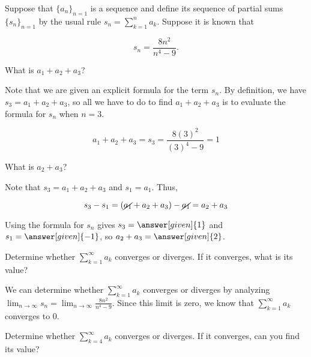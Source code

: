\documentclass{ximera}
\begin{document}
\begin{example}
Suppose that $\{a_n\}_{n=1}$ is a sequence and define its sequence of partial sums $\{s_n\}_{n=1}$ by the usual rule $s_n = \sum_{k=1}^n a_k$.  Suppose it is known that

\[
s_n = \frac{8n^2}{n^4-9}.
\]

\begin{question}
What is $a_1+a_2+a_3$?  

\begin{explanation}
Note that we are given an explicit formula for the term $s_n$.  By definition, we have $s_3 = a_1+a_2+a_3$, so all we have to do to find $a_1+a_2+a_3$ is to evaluate the formula for $s_n$ when $n=3$.

\[
a_1+a_2+a_3 = s_3 = \frac{8(3)^2}{(3)^4-9} = 1
\]

\end{explanation}
\end{question}

\begin{question}
What is $a_2+a_3$?

\begin{explanation}
Note that $s_3 = a_1+a_2+a_3$ and $s_1 = a_1$.  Thus, 

\[s_3 -s_1 = \left(\cancel{a_1}+ a_2+a_3\right) -\cancel{a_1} = a_2+a_3\]

Using the formula for $s_n$ gives $s_3 = \answer[given]{1}$ and $s_1=\answer[given]{-1}$, so $a_2+a_3 =  \answer[given]{2}$.
\end{explanation}
\end{question}

\begin{question}
Determine whether $\sum_{k=1}^{\infty} a_k$ converges or diverges.  If it converges, what is its value?

\begin{explanation}
We can determine whether $\sum_{k=1}^{\infty} a_k$ converges or diverges by analyzing $\lim_{n \to \infty} s_n = \lim_{n \to \infty} \frac{8n^2}{n^4-9}$.  Since this limit is zero, we know that $\sum_{k=1}^{\infty} a_k$ converges to $0$.
\end{explanation}
\end{question}

\begin{question}
Determine whether $\sum_{k=4}^{\infty} a_k$ converges or diverges.  If it converges, can you find its value?


\end{question}
\end{example}
\end{document}
